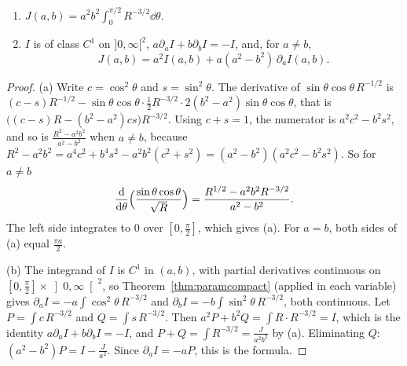 \begin{lemma}\label{lem:jderiv}
\begin{enumerate}[label=(\alph*)]
\item $\displaystyle J(a,b)=a^2b^2\int_0^{\pi/2}R^{-3/2}\dd\theta$.
\item $I$ is of class $C^1$ on $]0,\infty[^2$, $a\partial_aI+b\partial_bI=-I$, and, for $a\ne b$,
\[
J(a,b)=a^2I(a,b)+a(a^2-b^2)\,\partial_aI(a,b).
\]
\end{enumerate}
\end{lemma}
\begin{proof}
(a) Write $c=\cos^2\theta$ and $s=\sin^2\theta$. The derivative of $\sin\theta\cos\theta\,R^{-1/2}$ is
$(c-s)R^{-1/2}-\sin\theta\cos\theta\cdot\frac12R^{-3/2}\cdot2(b^2-a^2)\sin\theta\cos\theta$, that is $\bigl((c-s)R-(b^2-a^2)cs\bigr)R^{-3/2}$. Using $c+s=1$, the
numerator is $a^2c^2-b^2s^2$, and so is $\frac{R^2-a^2b^2}{a^2-b^2}$ when $a\ne b$, because
$R^2-a^2b^2=a^4c^2+b^4s^2-a^2b^2(c^2+s^2)=(a^2-b^2)(a^2c^2-b^2s^2)$. So for $a\ne b$
\[
\frac{\mathrm d}{\mathrm d\theta}\Bigl(\frac{\sin\theta\cos\theta}{\sqrt R}\Bigr)=\frac{R^{1/2}-a^2b^2R^{-3/2}}{a^2-b^2}.
\]
The left side integrates to $0$ over $[0,\frac\pi2]$, which gives (a). For $a=b$, both sides of (a) equal $\frac{\pi a}2$.

(b) The integrand of $I$ is $C^1$ in $(a,b)$, with partial derivatives continuous on $[0,\frac\pi2]\times\left]0,\infty\right[^2$, so Theorem~\ref{thm:paramcompact} (applied in each variable)
gives $\partial_aI=-a\int\cos^2\theta\,R^{-3/2}$ and $\partial_bI=-b\int\sin^2\theta\,R^{-3/2}$, both continuous. Let $P=\int c\,R^{-3/2}$ and $Q=\int s\,R^{-3/2}$. Then
$a^2P+b^2Q=\int R\cdot R^{-3/2}=I$, which is the identity $a\partial_aI+b\partial_bI=-I$, and $P+Q=\int R^{-3/2}=\frac J{a^2b^2}$ by (a). Eliminating $Q$:
$(a^2-b^2)P=I-\frac J{a^2}$. Since $\partial_aI=-aP$, this is the formula.
\end{proof}

